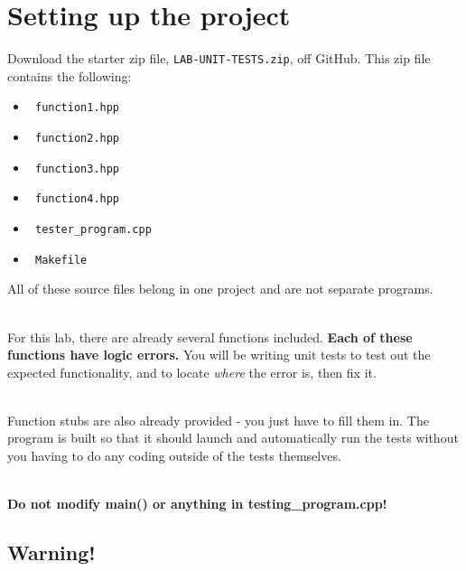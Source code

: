 \section{Setting up the project}

Download the starter zip file, \texttt{LAB-UNIT-TESTS.zip}, off GitHub. This zip file contains the following:

\begin{itemize}
    \item   \texttt{ function1.hpp }
    \item   \texttt{ function2.hpp }
    \item   \texttt{ function3.hpp }
    \item   \texttt{ function4.hpp }
    \item   \texttt{ tester\_program.cpp }
    \item   \texttt{ Makefile }
\end{itemize}

All of these source files belong in one project and are not separate programs.

~\\ For this lab, there are already several functions included.
\textbf{Each of these functions have logic errors.} You will be
writing unit tests to test out the expected functionality, and
to locate \textit{where} the error is, then fix it.

~\\ Function stubs are also already provided - you just have to fill them in.
The program is built so that it should launch and automatically run the
tests without you having to do any coding outside of the tests themselves.

~\\ \textbf{Do not modify main() or anything in testing\_program.cpp!}

\subsection*{Warning!}

